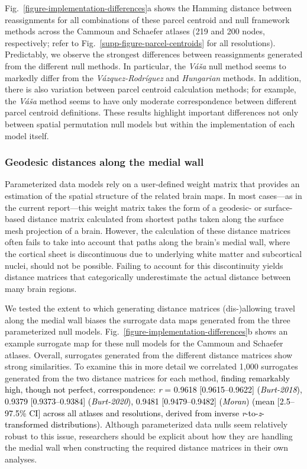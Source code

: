 \documentclass[12pt,aps,pra,reprint,showkeys]{revtex4-1}
\newcommand{\nimg}[1]{\textcolor{black}{{#1}}}
\begin{document}
Fig.~\ref{figure-implementation-differences}a shows the Hamming distance between reassignments for all combinations of these parcel centroid and null framework methods across the Cammoun and Schaefer atlases (219 and 200 nodes, respectively; refer to Fig.~\ref{supp-figure-parcel-centroids} for all resolutions).
Predictably, we observe the strongest differences between reassignments generated from the different null methods.
In particular, the \textit{V{\'a}{\v{s}}a} null method seems to markedly differ from the \textit{V{\'a}zquez-Rodr{\'i}guez} and \textit{Hungarian} methods.
In addition, there is also variation between parcel centroid calculation methods; for example, the \textit{V{\'a}{\v{s}}a} method seems to have only moderate correspondence between different parcel centroid definitions.
These results highlight important differences not only between spatial permutation null models but within the implementation of each model itself.

\subsubsection*{Geodesic distances along the medial wall}

Parameterized data models rely on a user-defined weight matrix that provides an estimation of the spatial structure of the related brain maps.
In most cases---as in the current report---this weight matrix takes the form of a geodesic- or surface-based distance matrix calculated from shortest paths taken along the surface mesh projection of a brain.
However, the calculation of these distance matrices often fails to take into account that paths along the brain's medial wall, where the cortical sheet is discontinuous due to underlying white matter and subcortical nuclei, should not be possible.
Failing to account for this discontinuity yields distance matrices that categorically underestimate the actual distance between many brain regions.

We tested the extent to which generating distance matrices (dis-)allowing travel along the medial wall biases the surrogate data maps generated from the three parameterized null models.
Fig.~\ref{figure-implementation-differences}b shows an example surrogate map for these null models for the Cammoun and Schaefer atlases.
Overall, surrogates generated from the different distance matrices show strong similarities.
To examine this in more detail we correlated 1,000 surrogates generated from the two distance matrices for each method, \nimg{finding remarkably high, though not perfect, correspondence: \emph{r} = 0.9618 [0.9615--0.9622] (\textit{Burt-2018}), 0.9379 [0.9373--0.9384] (\textit{Burt-2020}), 0.9481 [0.9479--0.9482] (\textit{Moran}) (mean [2.5--97.5\% CI] across all atlases and resolutions, derived from inverse \emph{r}-to-\emph{z}-transformed distributions).}
Although parameterized data nulls seem relatively robust to this issue, researchers should be explicit about how they are handling the medial wall when constructing the required distance matrices in their own analyses.
\end{document}
